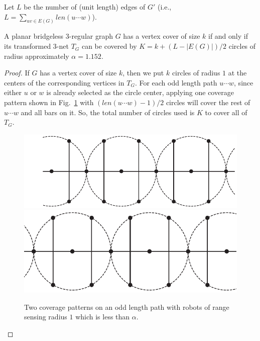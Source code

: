 Let $L$ be the number of (unit length) edges of $G'$ (i.e., $L = 
\sum_{uv \in E(G)}len(u\cdots w)$). 
\begin{lemma}\label{l:bl}
A planar bridgeless $3$-regular graph $G$ has a vertex cover of size 
$k$ if and only if its transformed 3-net $T_G$ can be covered
by $K = k + (L-|E(G)|)/2$ circles of radius approximately $\alpha = 1.152$.
\end{lemma}
\begin{proof}
If $G$ has a vertex cover of size $k$, then we put $k$ circles of radius $1$
at the centers of the corresponding vertices in $T_G$. 
%
For each odd length path $u\cdots w$, since either $u$ or $w$ is already 
selected as the circle center, applying one coverage pattern shown
in Fig.~\ref{fig:pathcover} with $(len(u\cdots w) - 1)/2$ circles will cover 
the rest of $u\cdots w$ and all bars on it. So, the total number of circles
used is $K$ to cover all of $T_G$. 

\begin{figure}[!ht]
  \vspace*{0mm}
      \centering
      \includegraphics[scale=0.3]{chapters/osg/figures/edgepath1-eps-converted-to.pdf}\vspace{3mm}
      \hfill
      \includegraphics[scale=0.3]{chapters/osg/figures/edgepath2-eps-converted-to.pdf}
  \vspace*{0mm}
     \caption{Two coverage patterns on an odd length path with robots of 
      range sensing radius $1$ which is less than $\alpha$.}
      \label{fig:pathcover}
  \end{figure}
  

\end{proof}
